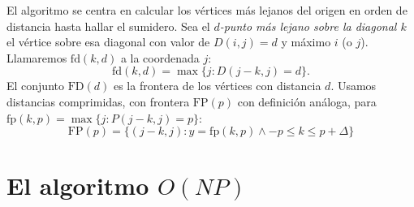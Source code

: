   El algoritmo se centra en calcular los vértices más lejanos del origen
  en orden de distancia hasta hallar el sumidero.
  Sea el \emph{\(d\)\nobreakdash-punto más lejano sobre la diagonal \(k\)}
  el vértice sobre esa diagonal con valor de \(D(i, j) = d\) y máximo \(i\)
  (o \(j\)).
  Llamaremos \(\mathrm{fd}(k, d)\) a la coordenada \(j\):
  \begin{equation}
    \label{eq:LCS-WMMM-fd}
    \mathrm{fd}(k, d)
      = \max \{ j \colon D(j - k, j) = d \}.
  \end{equation}
  El conjunto \(\mathrm{FD}(d)\) es la frontera de los vértices
  con distancia \(d\).
  Usamos distancias comprimidas,
  con frontera \(\mathrm{FP}(p)\)
  con definición análoga,
  para \(\mathrm{fp}(k, p) = \max \{ j \colon P(j - k, j) = p \}\):
  \begin{equation}
    \label{eq:LCS-WMMM-FD}
    \mathrm{FP}(p)
      = \{ (j - k, j)
             \colon y = \mathrm{fp}(k, p) \wedge -p \le k \le p + \Delta
        \}
  \end{equation}

\section[El algoritmo \(O(N P)\)]
        {El algoritmo \boldmath\(O(N P)\)\unboldmath}
\label{sec:LCS-WMMM}

